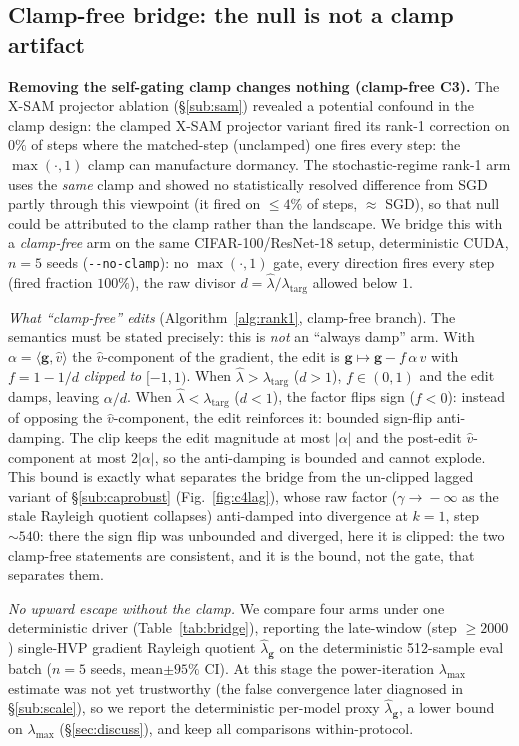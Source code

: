 \documentclass{article}
\theoremstyle{plain}
\theoremstyle{definition}
\theoremstyle{remark}
\newcommand{\lmax}{\lambda_{\max}}
\newcommand{\lhatg}{\hat{\lambda}_{\mathbf{g}}}
\begin{document}
\subsection{Clamp-free bridge: the null is not a clamp artifact}
\label{sub:bridge}
\textbf{Removing the self-gating clamp changes nothing (clamp-free C3).} The
X-SAM projector ablation (\S\ref{sub:sam}) revealed a potential confound in
the clamp design: the clamped X-SAM projector variant fired its rank-1 correction on $0\%$ of
steps where the matched-step (unclamped) one fires every step: the
$\max(\cdot,1)$ clamp can manufacture dormancy. The stochastic-regime
rank-1 arm uses
the \emph{same} clamp and showed no statistically resolved difference
from SGD partly through this viewpoint (it fired
on $\le\!4\%$ of steps, $\approx$ SGD), so that null could be
attributed to the clamp rather than the landscape. We
bridge this with a \emph{clamp-free} arm on the same CIFAR-100/ResNet-18
setup, deterministic CUDA, $n{=}5$ seeds (\texttt{-{}-no-clamp}): no
$\max(\cdot,1)$ gate, every direction fires every step (fired fraction
$100\%$), the raw divisor $d=\hat\lambda/\lambda_{\mathrm{targ}}$ allowed
below $1$.

\emph{What ``clamp-free'' edits} (Algorithm~\ref{alg:rank1}, clamp-free
branch). The semantics must be stated precisely: this
is \emph{not} an ``always damp'' arm. With $\alpha=\langle
\mathbf{g},\hat v\rangle$ the $\hat v$-component of the gradient, the edit is
$\mathbf{g}\mapsto\mathbf{g}-f\,\alpha\,\hat v$ with $f=1-1/d$ \emph{clipped
to} $[-1,1)$. When $\hat\lambda>\lambda_{\mathrm{targ}}$ ($d>1$), $f\in(0,1)$
and the edit damps, leaving $\alpha/d$. When
$\hat\lambda<\lambda_{\mathrm{targ}}$ ($d<1$), the factor flips sign
($f<0$): instead of opposing the $\hat v$-component, the edit reinforces
it: bounded sign-flip anti-damping. The clip keeps the edit magnitude at
most $|\alpha|$ and the post-edit $\hat v$-component at most $2|\alpha|$, so
the anti-damping is bounded and cannot explode. This bound is exactly what
separates the bridge from the un-clipped lagged variant of
\S\ref{sub:caprobust} (Fig.~\ref{fig:c4lag}), whose raw factor
($\gamma\!\to\!-\infty$ as the stale Rayleigh quotient collapses) anti-damped
into divergence at $k{=}1$, step $\sim\!540$: there the sign flip was
unbounded and diverged, here it is clipped: the two clamp-free statements
are consistent, and it is the bound, not the gate, that separates them.

\emph{No upward escape without the clamp.} We compare four arms under one
deterministic driver (\mbox{Table~\ref{tab:bridge}}), reporting the late-window
(step $\geq 2000$) single-HVP gradient Rayleigh quotient $\lhatg$ on the
deterministic 512-sample eval batch ($n{=}5$ seeds, mean$\pm 95\%$ CI). At
this stage the power-iteration $\lmax$ estimate was not yet trustworthy (the
false convergence later diagnosed in \S\ref{sub:scale}), so we report the
deterministic per-model proxy $\lhatg$, a lower bound on $\lmax$
(\S\ref{sec:discuss}), and keep all comparisons within-protocol.
\end{document}
